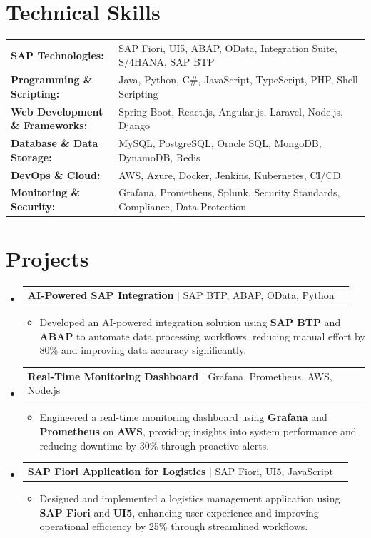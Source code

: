 \documentclass[letterpaper,10pt]{article}
\makeatletter
\newcommand{\resumeItem}[1]{
  \item{\fontsize{8pt}{9pt}\selectfont
    #1 \vspace{-3pt}
  }
}
\newcommand{\resumeProjectHeading}[2]{
    \item
    \begin{tabular*}{1.001\textwidth}{l@{\extracolsep{\fill}}r}
      \fontsize{8.5pt}{10pt}#1 & \textbf{\fontsize{8.5pt}{10pt} #2}\\
    \end{tabular*}\vspace{-7pt}
}
\newcommand{\resumeSubHeadingListStart}{\begin{itemize}[leftmargin=0pt, label={}]}
\newcommand{\resumeSubHeadingListEnd}{\end{itemize}}
\newcommand{\resumeItemListStart}{\begin{itemize}[leftmargin=*]}
\newcommand{\resumeItemListEnd}{\end{itemize}\vspace{-5pt}}
\makeatother
\begin{document}
\section{Technical Skills}
        \vspace{-14pt}
        \begin{table}[h]
            \fontsize{8pt}{9pt}\selectfont
            \begin{tabular}{p{0.3\linewidth} p{0.7\linewidth}}
                \textbf{SAP Technologies:} & SAP Fiori, UI5, ABAP, OData, Integration Suite, S/4HANA, SAP BTP \\
                \textbf{Programming \& Scripting:} & Java, Python, C\#, JavaScript, TypeScript, PHP, Shell Scripting \\
                \textbf{Web Development \& Frameworks:} & Spring Boot, React.js, Angular.js, Laravel, Node.js, Django \\
                \textbf{Database \& Data Storage:} & MySQL, PostgreSQL, Oracle SQL, MongoDB, DynamoDB, Redis \\
                \textbf{DevOps \& Cloud:} & AWS, Azure, Docker, Jenkins, Kubernetes, CI/CD \\
                \textbf{Monitoring \& Security:} & Grafana, Prometheus, Splunk, Security Standards, Compliance, Data Protection \\
            \end{tabular}
        \end{table}
 \vspace{-18pt}

\section{Projects}
    \vspace{-5pt}
    \resumeSubHeadingListStart
          \resumeProjectHeading
            {\textbf{AI-Powered SAP Integration} $|$ SAP BTP, ABAP, OData, Python}{}
            \resumeItemListStart
                \resumeItem{Developed an AI-powered integration solution using \textbf{SAP BTP} and \textbf{ABAP} to automate data processing workflows, reducing manual effort by 80\% and improving data accuracy significantly.}
            \resumeItemListEnd
        \vspace{-12pt}
    
        \resumeProjectHeading
            {\textbf{Real-Time Monitoring Dashboard} $|$ Grafana, Prometheus, AWS, Node.js}{}
        \resumeItemListStart
                \resumeItem{Engineered a real-time monitoring dashboard using \textbf{Grafana} and \textbf{Prometheus} on \textbf{AWS}, providing insights into system performance and reducing downtime by 30\% through proactive alerts.}
        \resumeItemListEnd
      \vspace{-12pt}
      \resumeProjectHeading
        {\textbf{SAP Fiori Application for Logistics} $|$ SAP Fiori, UI5, JavaScript}{}
    \resumeItemListStart
            \resumeItem{Designed and implemented a logistics management application using \textbf{SAP Fiori} and \textbf{UI5}, enhancing user experience and improving operational efficiency by 25\% through streamlined workflows.}
    \resumeItemListEnd
    \resumeSubHeadingListEnd
\end{document}

